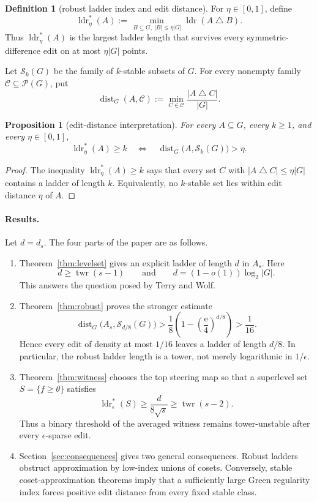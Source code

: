 \documentclass[11pt]{article}
\theoremstyle{plain}
\newtheorem{proposition}[theorem]{Proposition}
\theoremstyle{definition}
\newtheorem{definition}[theorem]{Definition}
\numberwithin{theorem}{section}
\newcommand{\abs}[1]{\lvert #1\rvert}
\newcommand{\twr}{\operatorname{twr}}
\newcommand{\ldr}{\operatorname{ldr}}
\newcommand{\ldrs}{\operatorname{ldr}^{*}}
\newcommand{\Stable}{\mathcal{S}}
\newcommand{\econst}{\mathrm e}
\begin{document}
\begin{definition}[robust ladder index and edit distance]\label{def:robust-index}
For $\eta\in[0,1]$, define
\[
  \ldrs_\eta(A):=
  \min_{\,B\subseteq G,\ \abs B\le\eta\abs G}
  \ldr(A\mathbin\triangle B).
\]
Thus $\ldrs_\eta(A)$ is the largest ladder length that survives every
symmetric-difference edit on at most $\eta\abs G$ points.

Let $\Stable_k(G)$ be the family of $k$-stable subsets of $G$.  For every
nonempty family $\mathcal C\subseteq\mathcal P(G)$, put
\[
  \operatorname{dist}_G(A,\mathcal C)
  :=\min_{C\in\mathcal C}\frac{\abs{A\mathbin\triangle C}}{\abs G}.
\]
\end{definition}

\begin{proposition}[edit-distance interpretation]\label{prop:distance}
For every $A\subseteq G$, every $k\ge1$, and every $\eta\in[0,1]$,
\[
  \ldrs_\eta(A)\ge k
  \quad\Longleftrightarrow\quad
  \operatorname{dist}_G\bigl(A,\Stable_k(G)\bigr)>\eta.
\]
\end{proposition}

\begin{proof}
The inequality $\ldrs_\eta(A)\ge k$ says that every set $C$ with
$\abs{A\mathbin\triangle C}\le\eta\abs G$ contains a ladder of length
$k$.  Equivalently, no $k$-stable set lies within edit distance $\eta$ of
$A$.
\end{proof}

\paragraph{Results.}
Let $d=d_s$.  The four parts of the paper are as follows.
\begin{enumerate}
\item Theorem~\ref{thm:levelset} gives an explicit ladder of length $d$ in
  $A_s$.  Here
  \[
    d\ge\twr(s-1)
    \qquad\text{and}\qquad
    d=(1-o(1))\log_2\abs G.
  \]
  This answers the question posed by Terry and Wolf.
\item Theorem~\ref{thm:robust} proves the stronger estimate
  \[
    \operatorname{dist}_G\bigl(A_s,\Stable_{d/8}(G)\bigr)
    >\frac18\left(1-\left(\frac{\econst}{4}\right)^{d/8}\right)
    >\frac1{16}.
  \]
  Hence every edit of density at most $1/16$ leaves a ladder of length
  $d/8$.  In particular, the robust ladder length is a tower, not merely
  logarithmic in $1/\epsilon$.
\item Theorem~\ref{thm:witness} chooses the top steering map so that a
  superlevel set $S=\{f\ge\theta\}$ satisfies
  \[
    \ldrs_\epsilon(S)\ge\frac{d}{8\sqrt{s}}\ge\twr(s-2).
  \]
  Thus a binary threshold of the averaged witness remains tower-unstable
  after every $\epsilon$-sparse edit.
\item Section~\ref{sec:consequences} gives two general consequences.
  Robust ladders obstruct approximation by low-index unions of cosets.
  Conversely, stable coset-approximation theorems imply that a sufficiently
  large Green regularity index forces positive edit distance from every
  fixed stable class.
\end{enumerate}
\end{document}
